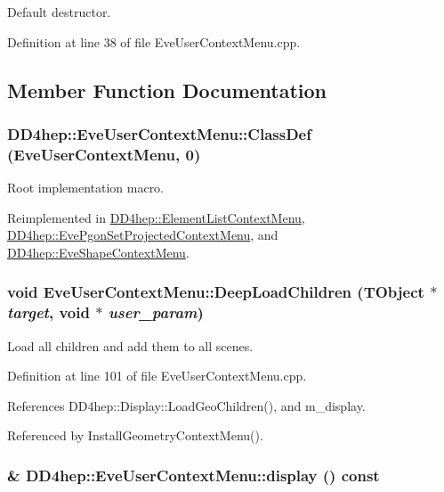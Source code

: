 Default destructor. 

Definition at line 38 of file EveUserContextMenu.cpp.

\subsection{Member Function Documentation}
\hypertarget{class_d_d4hep_1_1_eve_user_context_menu_a05246cb30938d2a51dbb68468a3e8f8f}{
\subsubsection[{ClassDef}]{\setlength{\rightskip}{0pt plus 5cm}DD4hep::EveUserContextMenu::ClassDef ({\bf EveUserContextMenu}, \/  0)}}
\label{class_d_d4hep_1_1_eve_user_context_menu_a05246cb30938d2a51dbb68468a3e8f8f}


Root implementation macro. 

Reimplemented in \hyperlink{class_d_d4hep_1_1_element_list_context_menu_ab60b3abac1f709147788e8de09e8aebb}{DD4hep::ElementListContextMenu}, \hyperlink{class_d_d4hep_1_1_eve_pgon_set_projected_context_menu_aea367eff04cd968f43590dd69a718ffb}{DD4hep::EvePgonSetProjectedContextMenu}, and \hyperlink{class_d_d4hep_1_1_eve_shape_context_menu_a265ec0c7f5d3dd2f384958e32e5c51d9}{DD4hep::EveShapeContextMenu}.\hypertarget{class_d_d4hep_1_1_eve_user_context_menu_a10d91b40facd41a45d562d9667767884}{
\subsubsection[{DeepLoadChildren}]{\setlength{\rightskip}{0pt plus 5cm}void EveUserContextMenu::DeepLoadChildren ({\bf TObject} $\ast$ {\em target}, \/  void $\ast$ {\em user\_\-param})}}
\label{class_d_d4hep_1_1_eve_user_context_menu_a10d91b40facd41a45d562d9667767884}


Load all children and add them to all scenes. 

Definition at line 101 of file EveUserContextMenu.cpp.

References DD4hep::Display::LoadGeoChildren(), and m\_\-display.

Referenced by InstallGeometryContextMenu().\hypertarget{class_d_d4hep_1_1_eve_user_context_menu_a9f9c6ac57dba775c31a0375064ab026b}{
\subsubsection[{display}]{\& DD4hep::EveUserContextMenu::display () const}}
\label{class_d_d4hep_1_1_eve_user_context_menu_a9f9c6ac57dba775c31a0375064ab026b}


